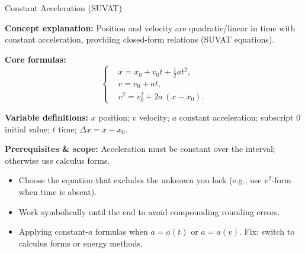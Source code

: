 \begin{KnowledgePoint}{Constant Acceleration (SUVAT) \Core}
  \KPFormulas
  \begin{formulabox}
  \textbf{Concept explanation:} Position and velocity are quadratic/linear in time with constant acceleration, providing closed-form relations (SUVAT equations).

  \textbf{Core formulas:}
  \[
  \left\{\begin{aligned}
    &x=x_0+v_0 t+\tfrac12 a t^2,\\
    &v=v_0+at,\\
    &v^2=v_0^2+2a\,(x-x_0).
  \end{aligned}\right.
  \]

  \textbf{Variable definitions:} $x$ position; $v$ velocity; $a$ constant acceleration; subscript $0$ initial value; $t$ time; $\Delta x=x-x_0$.


  \textbf{Prerequisites \& scope:} Acceleration must be constant over the interval; otherwise use calculus forms.
  \end{formulabox}

  \KPHeuristics
  \begin{heuristicsbox}
  \begin{itemize}[leftmargin=*]
    \item Choose the equation that excludes the unknown you lack (e.g., use $v^2$-form when time is absent).
    \item Work symbolically until the end to avoid compounding rounding errors.
  \end{itemize}
  \vspace{0.4em}
  \begin{itemize}[leftmargin=*]
    \item Applying constant-$a$ formulas when $a=a(t)$ or $a=a(v)$. Fix: switch to calculus forms or energy methods.
  \end{itemize}
  \end{heuristicsbox}


\end{KnowledgePoint}
